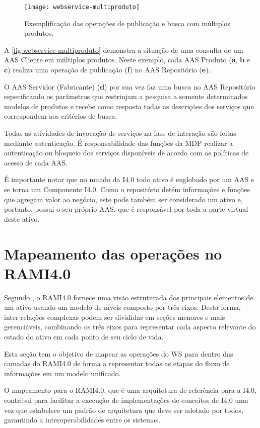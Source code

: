 	\begin{figure}[htb]
		\centering
		\caption{Exemplificação das operações de publicação e busca com múltiplos produtos.}
		\label{fig:webservice-multiproduto}
		\texttt{[image: webservice-multiproduto]}
	\end{figure}

	
	A \autoref{fig:webservice-multiproduto} demonstra a situação de uma consulta de um AAS Cliente em múltiplos produtos. Neste exemplo, cada AAS Produto (\textbf{a}, \textbf{b} e \textbf{c}) realiza uma operação de publicação (\textbf{f}) no AAS Repositório (\textbf{e}). 
	
	O AAS Servidor (Fabricante) (\textbf{d}) por sua vez faz uma busca no AAS Repositório especificando os parâmetros que restrinjam a pesquisa a somente determinados modelos de produtos e recebe como resposta todas as descrições dos serviços que correspondem aos critérios de busca.	
	
	Todas as atividades de invocação de serviços na fase de interação são feitas mediante autenticação. É responsabilidade das funções da MDP realizar a autenticação ou bloqueio dos serviços disponíveis de acordo com as políticas de acesso de cada AAS.
	
	É importante notar que no mundo da I4.0 todo ativo é englobado por um AAS e se torna um Componente I4.0. Como o repositório detém informações e funções que agregam valor ao negócio, este pode também ser considerado um ativo e, portanto, possui o seu próprio AAS, que é responsável por toda a parte virtual deste ativo.
	
\section{Mapeamento das operações no RAMI4.0}
	
	Segundo , o RAMI4.0 fornece uma visão estruturada dos principais elementos de um ativo usando um modelo de níveis composto por três eixos. Desta forma, inter-relações complexas podem ser divididas em seções menores e mais gerenciáveis, combinando os três eixos para representar cada aspecto relevante do estado do ativo em cada ponto de seu ciclo de vida.
	
	Esta seção tem o objetivo de mapear as operações do WS para dentro das camadas do RAMI4.0 de forma a representar todas as etapas do fluxo de informações em um modelo unificado.
	
	O mapeamento para o RAMI4.0, que é uma arquitetura de referência para a I4.0, contribui para facilitar a execução de implementações de conceitos de I4.0 uma vez que estabelece um padrão de arquitetura que deve ser adotado por todos, garantindo a interoperabilidades entre os sistemas.

